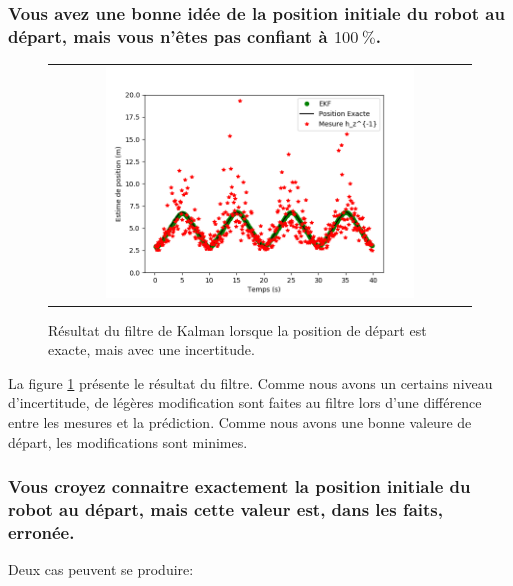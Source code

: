 \documentclass[12pt]{article}
\begin{document}
\subsubsection{Vous avez une bonne idée de la position initiale du robot au départ, mais vous n'êtes pas confiant à $100~\%$.}

\begin{figure}[ht]
 \begin{center}
  \begin{tabular}{c}
    \includegraphics[width=0.75\textwidth]{fig/kalman-position-exacte-incertitude.png}
  \end{tabular}
 \end{center}
\vspace{-0.25in}
    \caption{Résultat du filtre de Kalman lorsque la position de départ est exacte, mais avec une incertitude.}
    \label{kalman-position-exacte-incertitude}
\end{figure}

La figure \ref{kalman-position-exacte-incertitude} présente le résultat du filtre.
Comme nous avons un certains niveau d'incertitude, de légères modification sont faites au filtre lors d'une différence entre les mesures et la prédiction.
Comme nous avons une bonne valeure de départ, les modifications sont minimes.

\subsubsection{Vous croyez connaitre exactement la position initiale du robot au départ, mais cette valeur est, dans les faits, erronée.}

Deux cas peuvent se produire:
\end{document}
